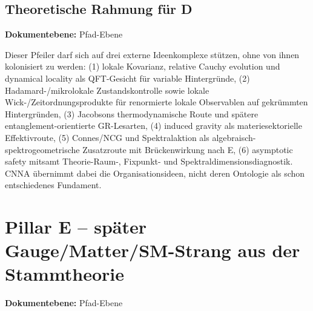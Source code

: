 \documentclass[11pt,a4paper]{article}
\newcommand{\doclevel}[1]{\par\small\noindent\textbf{Dokumentebene:} #1\par\normalsize\medskip}
\begin{document}
\subsection{Theoretische Rahmung für D}
\doclevel{Pfad-Ebene}
Dieser Pfeiler darf sich auf drei externe Ideenkomplexe stützen, ohne von ihnen kolonisiert zu werden:
(1) lokale Kovarianz, relative Cauchy evolution und dynamical locality als QFT-Gesicht für variable Hintergründe,\cite{BFV2003}\cite{FewsterVerch2012}\cite{FewsterLang2016}
(2) Hadamard-/mikrolokale Zustandskontrolle sowie lokale Wick-/Zeitordnungsprodukte für renormierte lokale Observablen auf gekrümmten Hintergründen,\cite{Radzikowski1996}\cite{BrunettiFredenhagenKoehler1996}\cite{HollandsWald2001}\cite{HollandsWald2002}
(3) Jacobsons thermodynamische Route und spätere entanglement-orientierte GR-Lesarten,\cite{Jacobson1995}
(4) induced gravity als materiesektorielle Effektivroute,\cite{Visser2002}
(5) Connes/NCG und Spektralaktion als algebraisch-spektrogeometrische Zusatzroute mit Brückenwirkung nach E,\cite{ChamseddineConnes1996}\cite{ChamseddineConnes2007}
(6) asymptotic safety mitsamt Theorie-Raum-, Fixpunkt- und Spektraldimensionsdiagnostik.\cite{Reuter1998}\cite{ReuterSaueressig2012}\cite{LauscherReuter2005}
CNNA übernimmt dabei die Organisationsideen, nicht deren Ontologie als schon entschiedenes Fundament.


\newpage
\section{Pillar E -- später Gauge/Matter/SM-Strang aus der Stammtheorie}
\doclevel{Pfad-Ebene}
\end{document}
